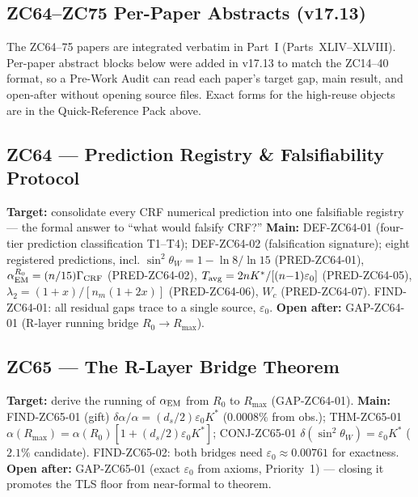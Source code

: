 \documentclass[11pt, a4paper]{article}
\newcommand{\swsq}{\sin^2\theta_W}
\newcommand{\Tavg}{T_{\rm avg}}
\newcommand{\Kstar}{K^*}
\begin{document}
\newpage

\subsection*{ZC64--ZC75 Per-Paper Abstracts (v17.13)}

\begin{contentsbox}[title={Per-Paper Registry --- Format Note}]
The ZC64--75 papers are integrated verbatim in Part~I (Parts~XLIV--XLVIII).
Per-paper abstract blocks below were added in v17.13 to match the
ZC14--40 format, so a Pre-Work Audit can read each paper's target gap,
main result, and open-after without opening source files. Exact forms
for the high-reuse objects are in the Quick-Reference Pack above.
\end{contentsbox}

\subsection{ZC64 --- Prediction Registry \& Falsifiability Protocol}

\begin{zcbox}[title={ZC64: PRED-ZC64-01..08 --- Falsifiable Prediction Registry}]
\sloppy
\textbf{Target:} consolidate every CRF numerical prediction into one
falsifiable registry --- the formal answer to ``what would falsify CRF?''
\textbf{Main:} DEF-ZC64-01 (four-tier prediction classification T1--T4);
DEF-ZC64-02 (falsification signature); eight registered predictions, incl.
$\swsq = 1 - \ln 8/\ln 15$ (PRED-ZC64-01), $\alpha_{\rm EM}^{R_0}=(n/15)\Gamma_{\rm CRF}$
(PRED-ZC64-02), $\Tavg=2n\Kstar/[(n{-}1)\varepsilon_0]$ (PRED-ZC64-05),
$\lambda_2=(1{+}x)/[n_m(1{+}2x)]$ (PRED-ZC64-06), $W_c$ (PRED-ZC64-07).
FIND-ZC64-01: all residual gaps trace to a single source, $\varepsilon_0$.
\textbf{Open after:} GAP-ZC64-01 (R-layer running bridge $R_0{\to}R_{\max}$).
\end{zcbox}

\subsection{ZC65 --- The R-Layer Bridge Theorem}

\begin{zcbox}[title={ZC65: THM-ZC65-01 --- R-Layer Bridge (Near-Formal)}]
\sloppy
\textbf{Target:} derive the running of $\alpha_{\rm EM}$ from $R_0$ to
$R_{\max}$ (GAP-ZC64-01). \textbf{Main:} FIND-ZC65-01 (gift)
$\delta\alpha/\alpha = (d_s/2)\varepsilon_0\Kstar$ ($0.0008\%$ from obs.);
THM-ZC65-01 $\alpha(R_{\max}) = \alpha(R_0)[1 + (d_s/2)\varepsilon_0\Kstar]$;
CONJ-ZC65-01 $\delta(\swsq)=\varepsilon_0\Kstar$ ($2.1\%$ candidate).
FIND-ZC65-02: both bridges need $\varepsilon_0 \approx 0.00761$ for exactness.
\textbf{Open after:} GAP-ZC65-01 (exact $\varepsilon_0$ from axioms, Priority~1)
--- closing it promotes the TLS floor from near-formal to theorem.
\end{zcbox}
\end{document}

